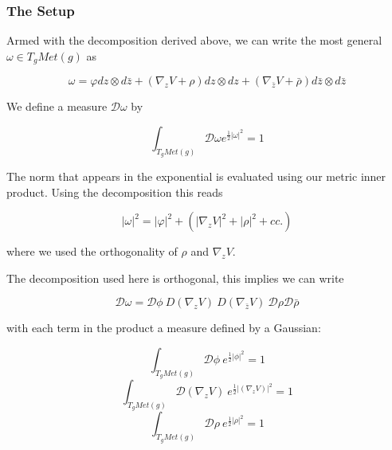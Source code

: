 \subsubsection{The Setup}
    Armed with the decomposition derived above, we can write the most general $\omega \in T_gMet(g)$ as

    \begin{equation}
        \omega = \varphi dz \otimes d\bar z + (\nabla_z V + \rho) dz \otimes d z + (\nabla_{\bar z} V + \bar \rho) d\bar z \otimes d \bar z
    \end{equation}

    We define a measure $\mathcal D \omega$ by

    \begin{equation}
        \int_{T_g Met(g)} \mathcal D \omega e^{\frac12 |\omega|^2} = 1
    \end{equation}


    The norm that appears in the exponential is evaluated using our metric inner product. Using the decomposition this reads

    \begin{equation}
        |\omega|^2 = |\varphi|^2 + (|\nabla_z V|^2 + |\rho|^2 + cc.)
    \end{equation}

    where we used the orthogonality of $\rho$ and $\nabla_z V$.


    The decomposition used here is orthogonal, this implies we can write

    \begin{equation}
        \mathcal D \omega = \mathcal D \phi \mathcal
        ~ D (\nabla_z V)\mathcal
        ~ D (\nabla_{\bar z} V)
        ~ \mathcal D \rho \mathcal D \bar \rho
    \end{equation}

    with each term in the product a measure defined by a Gaussian:


    \begin{equation}
         \int_{T_g Met(g)} \mathcal D \phi ~ e^{\frac12 |\phi|^2} = 1
    \end{equation}
    \begin{equation}
         \int_{T_g Met(g)} \mathcal D (\nabla_z V) ~ e^{\frac12 |(\nabla_z V)|^2} = 1
    \end{equation}
    \begin{equation}
         \int_{T_g Met(g)} \mathcal D \rho ~ e^{\frac12 |\rho|^2} = 1
    \end{equation}


